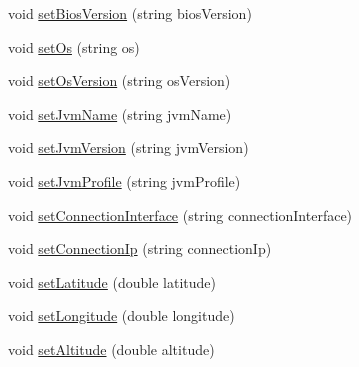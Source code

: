 \begin{DoxyCompactItemize}
\item 
void \hyperlink{class_edc_device_profile_a00e2a0e111f5b97e7d7c46b3b65a051c}{set\-Bios\-Version} (string bios\-Version)
\item 
void \hyperlink{class_edc_device_profile_ae35117293bf9b4e0337a2381bcd83c3d}{set\-Os} (string os)
\item 
void \hyperlink{class_edc_device_profile_a20c411bc3709e5c97a1f663dfa363ee3}{set\-Os\-Version} (string os\-Version)
\item 
void \hyperlink{class_edc_device_profile_a6b726d694b8340ce36fdadcd6565f810}{set\-Jvm\-Name} (string jvm\-Name)
\item 
void \hyperlink{class_edc_device_profile_ab56910622240b41f9fb69203ef108653}{set\-Jvm\-Version} (string jvm\-Version)
\item 
void \hyperlink{class_edc_device_profile_ad037239af3decfdb0417a1a669935ca1}{set\-Jvm\-Profile} (string jvm\-Profile)
\item 
void \hyperlink{class_edc_device_profile_a16068b8e050ff3232d4e64c4c9e4a93b}{set\-Connection\-Interface} (string connection\-Interface)
\item 
void \hyperlink{class_edc_device_profile_a126907e344a8cba07dcc13652905faea}{set\-Connection\-Ip} (string connection\-Ip)
\item 
void \hyperlink{class_edc_device_profile_a46cbc6c4b70b01a027449f903966b2ba}{set\-Latitude} (double latitude)
\item 
void \hyperlink{class_edc_device_profile_a465d0e9558f63f8302c615ab2e16088b}{set\-Longitude} (double longitude)
\item 
void \hyperlink{class_edc_device_profile_a610a7222a27a503a4f40c0eddcf75e99}{set\-Altitude} (double altitude)
\end{DoxyCompactItemize}



